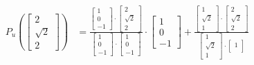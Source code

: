 \documentclass[11pt, a4paper, norsk]{NTNUoving}
\begin{document}
\begin{oppgave}
\begin{punkt}
        \begin{align*}
            P_{u}\left(\begin{bmatrix}
                2 \\
                \sqrt{2} \\
                2
            \end{bmatrix}\right) &= \frac{\begin{bmatrix}
                1 \\
                0 \\
                -1
            \end{bmatrix} \cdot \begin{bmatrix}
                2 \\
                \sqrt{2} \\
                2
            \end{bmatrix}}{\begin{bmatrix}
                1 \\
                0 \\
                -1
            \end{bmatrix} \cdot \begin{bmatrix}
                1 \\
                0 \\
                -1
            \end{bmatrix}} \cdot \begin{bmatrix}
                1 \\
                0 \\
                -1
            \end{bmatrix} + \frac{\begin{bmatrix}
                1 \\
                \sqrt{2} \\
                1
            \end{bmatrix} \cdot \begin{bmatrix}
                2 \\
                \sqrt{2} \\
                2
            \end{bmatrix}}{\begin{bmatrix}
                1 \\
                \sqrt{2} \\
                1
            \end{bmatrix} \cdot \begin{bmatrix}
                1 \\

\end{bmatrix}}
\end{align*}
\end{punkt}
\end{oppgave}
\end{document}
